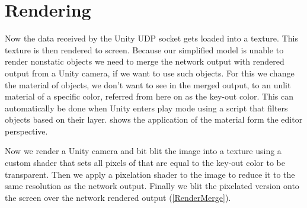 \section{Rendering}\label{rendering}
Now the data received by the Unity UDP socket gets loaded into a texture. This texture is then rendered to screen. Because our simplified model is unable to render nonstatic objects we need to merge the network output with rendered output from a Unity camera, if we want to use such objects. For this we change the material of objects, we don't want to see in the merged output, to an unlit material of a specific color, referred from here on as the key-out color. This can automatically be done when Unity enters play mode using a script that filters objects based on their layer.  shows the application of the material form the editor perspective.

Now we render a Unity camera and bit blit the image into a texture using a custom shader that sets all pixels of that are equal to the key-out color to be transparent. Then we apply a pixelation shader to the image to reduce it to the same resolution as the network output. Finally we blit the pixelated version onto the screen over the network rendered output (\cref{RenderMerge}).

